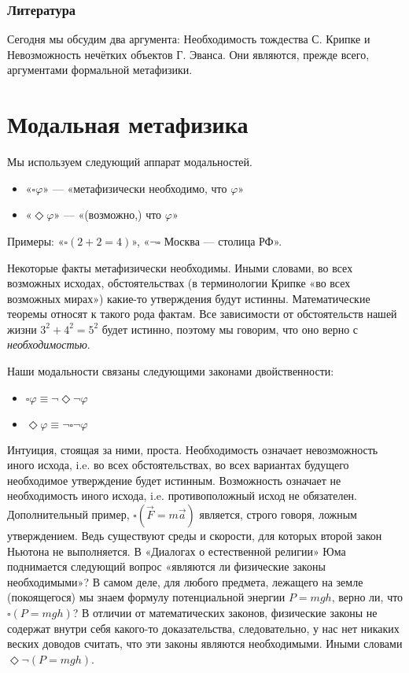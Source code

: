 \documentclass[openany]{book}
\theoremstyle{plain}
\theoremstyle{definition}
\begin{document}
\subsection{ Литература }




Сегодня мы обсудим два аргумента: Необходимость тождества С. Крипке и Невозможность нечётких объектов Г. Эванса. Они являются, прежде всего, аргументами формальной метафизики.

\chapter{ Модальная метафизика }

Мы используем следующий аппарат модальностей.
\begin{itemize}
\item «\(\square \varphi\)» — «метафизически необходимо, что \(\varphi\)»
\item «\(\Diamond \varphi\)» — «(возможно,) что \(\varphi\)»
\end{itemize}

Примеры: «\(\square (2+2=4)\)», «\(\neg \square\) Москва — столица РФ».

Некоторые факты метафизически необходимы. Иными словами, во всех возможных исходах, обстоятельствах (в терминологии Крипке «во всех возможных мирах») какие-то утверждения будут истинны. Математические теоремы относят к такого рода фактам. Все зависимости от обстоятельств нашей жизни \(3^2 + 4^2 = 5^2\) будет истинно, поэтому мы говорим, что оно верно с \textit{необходимостью}.

Наши модальности связаны следующими законами двойственности:
\begin{itemize}
\item \(\square \varphi \equiv \neg \Diamond \neg \varphi\)
\item \(\Diamond \varphi \equiv \neg \square \neg \varphi\)
\end{itemize}

Интуиция, стоящая за ними, проста. Необходимость означает невозможность иного исхода, i.e. во всех обстоятельствах, во всех вариантах будущего необходимое утверждение будет истинным. Возможность означает не необходимость иного исхода, i.e. противоположный исход не обязателен. Дополнительный пример, \(\square(\vec{F} = m \vec{a})\) является, строго говоря, ложным утверждением. Ведь существуют среды и скорости, для которых второй закон Ньютона не выполняется. В «Диалогах о естественной религии» Юма поднимается следующий вопрос «являются ли физические законы необходимыми»? В самом деле, для любого предмета, лежащего на земле (покоящегося) мы знаем формулу потенциальной энергии \(P = mgh\), верно ли, что \(\square(P = mgh)\)? В отличии от математических законов, физические законы не содержат внутри себя какого-то доказательства, следовательно, у нас нет никаких веских доводов считать, что эти законы являются необходимыми. Иными словами \(\Diamond \neg(P = mgh)\).
\end{document}
